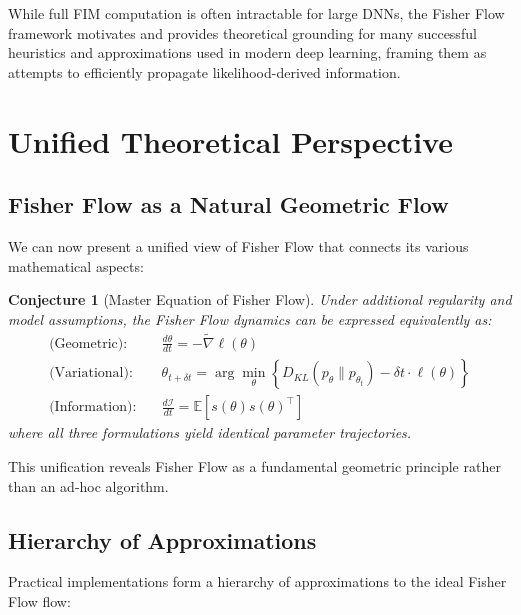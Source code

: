 \documentclass[11pt]{article}
\newtheorem{conjecture}[theorem]{Conjecture}
\begin{document}
While full FIM computation is often intractable for large DNNs, the Fisher Flow framework motivates and provides theoretical grounding for many successful heuristics and approximations used in modern deep learning, framing them as attempts to efficiently propagate likelihood-derived information.

\section{Unified Theoretical Perspective}

\subsection{Fisher Flow as a Natural Geometric Flow}

We can now present a unified view of Fisher Flow that connects its various mathematical aspects:

\begin{conjecture}[Master Equation of Fisher Flow]
\label{thm:master}
Under additional regularity and model assumptions, the Fisher Flow dynamics can be expressed equivalently as:
\begin{align}
\text{(Geometric):} \quad & \frac{d\theta}{dt} = -\tilde{\nabla} \ell(\theta) \\
\text{(Variational):} \quad & \theta_{t+\delta t} = \arg\min_\theta \left\{D_{KL}(p_\theta \| p_{\theta_t}) - \delta t \cdot \ell(\theta)\right\} \\
\text{(Information):} \quad & \frac{d\mathcal{I}}{dt} = \mathbb{E}[s(\theta)s(\theta)^\top]
\end{align}
where all three formulations yield identical parameter trajectories.
\end{conjecture}

This unification reveals Fisher Flow as a fundamental geometric principle rather than an ad-hoc algorithm.

\subsection{Hierarchy of Approximations}

Practical implementations form a hierarchy of approximations to the ideal Fisher Flow flow:
\end{document}
